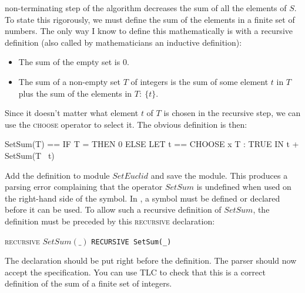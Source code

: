 non-terminating step of the algorithm decreases the sum of all the
elements of $S$.  To state this rigorously, we must define the sum of
the elements in a finite set of numbers.  The only way I know to define
this mathematically is with a 
recursive definition (also called by
mathematicians an 
inductive definition): 
\begin{itemize}
\item The sum of the empty set is 0.

\item The sum of a non-empty set $T$ of integers is the sum of some
element $t$ in $T$ plus the sum of the elements in $T :\: \{t\}$.
\end{itemize}
Since it doesn't matter what element $t$ of $T$ is chosen in the
recursive step, we can use the \textsc{choose} operator to select it.
The obvious definition is then:
\begin{display}
\begin{notla}
SetSum(T) == IF T = {} THEN 0
                       ELSE LET t == CHOOSE x \in T : TRUE
                            IN  t + SetSum(T \ {t}) 
\end{notla}
\begin{tlatex}
%
%
\end{tlatex}
\end{display}
Add the definition to module $SetEuclid$ and save the module.  This
produces a parsing error complaining that the operator $SetSum$ is
undefined when used on the right-hand side of the symbol.  In \tlaplus,
a symbol must be defined or declared before it can be used.  To allow
such a recursive definition of $SetSum$, the definition must be preceded
by this \textsc{recursive} declaration:
\begin{display}
\begin{twocols}
\textsc{recursive} $SetSum(\_)$
\midcol
\verb|RECURSIVE SetSum(_)|
\end{twocols}
\end{display}
The declaration should be put right before the definition.
%
The parser should now accept the specification.  You can use TLC
to check that this is a correct definition of the sum of a finite
set of integers.

